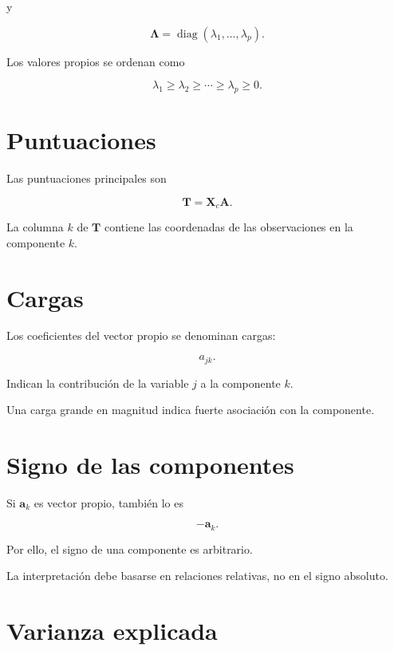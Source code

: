 \documentclass[
  spanish,
  10.5pt,
  letterpaper,
  DIV=11,
  numbers=noendperiod,
  oneside,
  open=any]{scrreprt}
\theoremstyle{definition}
\theoremstyle{definition}
\theoremstyle{plain}
\theoremstyle{remark}
\begin{document}
y

\[
\boldsymbol{\Lambda}
=
\operatorname{diag}
(\lambda_1,\ldots,\lambda_p).
\]

Los valores propios se ordenan como

\[
\lambda_1
\geq
\lambda_2
\geq
\cdots
\geq
\lambda_p
\geq 0.
\]

\section*{Puntuaciones}\label{puntuaciones}


Las puntuaciones principales son

\[
\mathbf{T}
=
\mathbf{X}_c\mathbf{A}.
\]

La columna \(k\) de \(\mathbf{T}\) contiene las coordenadas de las
observaciones en la componente \(k\).

\section*{Cargas}\label{cargas}


Los coeficientes del vector propio se denominan cargas:

\[
a_{jk}.
\]

Indican la contribución de la variable \(j\) a la componente \(k\).

Una carga grande en magnitud indica fuerte asociación con la componente.

\section*{Signo de las componentes}\label{signo-de-las-componentes}


Si \(\mathbf{a}_k\) es vector propio, también lo es

\[
-\mathbf{a}_k.
\]

Por ello, el signo de una componente es arbitrario.

La interpretación debe basarse en relaciones relativas, no en el signo
absoluto.

\section*{Varianza explicada}\label{varianza-explicada}
\end{document}
